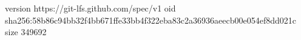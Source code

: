 version https://git-lfs.github.com/spec/v1
oid sha256:58b86c94bb32f4bb671ffe33bb4f322eba83c2a36936aeecb00e054ef8dd021c
size 349692
